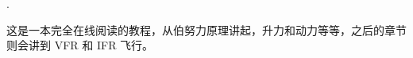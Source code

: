 \medskip

.
\medskip

 \noindent
\ifchinese
这是一本完全在线阅读的教程，从伯努力原理讲起，升力和动力等等，之后的章节则会讲到 VFR 和 IFR 飞行。
\fi
\iffalse
\IfLanguageName{english}{
This is a real online text book, beginning with Bernoulli's principle, drag and
power, and the like, with the later chapters covering even advanced aspects of
VFR as well as IFR flying.
}{}
\fi
{}

